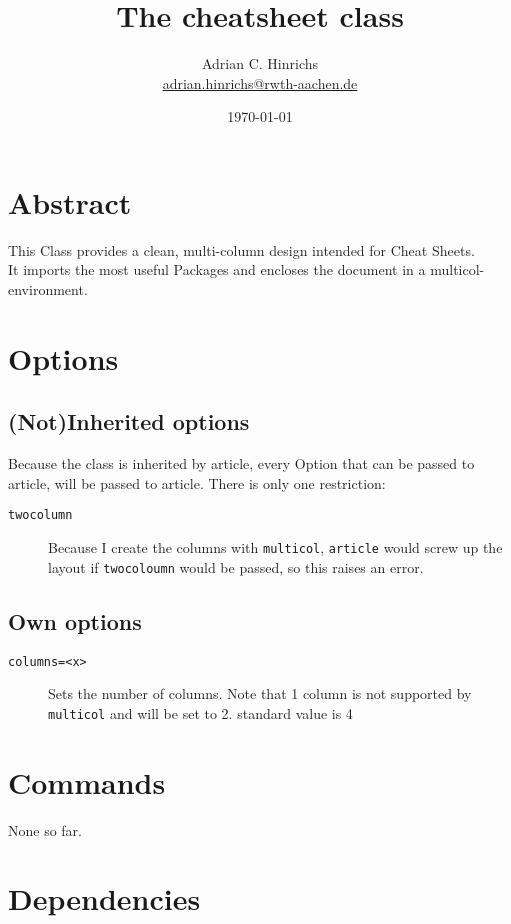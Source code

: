 \documentclass[a4paper,landscape,columns=3]{cheatsheet}
\title{The \textsf{cheatsheet} class\footnotemark}
\author{Adrian
  C. Hinrichs\\
  \href{mailto:adrian.hinrichs@rwth-aachen.de}{adrian.hinrichs@rwth-aachen.de}
}
\date{\today}
\begin{document}
\maketitle
{}
\section{Abstract}
This Class provides a clean, multi-column design intended for Cheat
Sheets.\\

It imports the most useful Packages and encloses the document in a
multicol-environment.
\section{Options}
\subsection{(Not)Inherited options}
Because the class is inherited by article, every Option that can be
passed to article, will be passed to article. There is only one
restriction:
\begin{description}
\item[\texttt{twocolumn}] Because I create the columns with
  \texttt{multicol}, \texttt{article} would screw up the layout if
  \texttt{twocoloumn} would be passed, so this raises an error.
\end{description}
\subsection{Own options}
\begin{description}
\item[\texttt{columns=<x>}] Sets the number of columns.  Note that 1
  column is not supported by \lstinline{multicol} and will be set to
  2.  standard value is 4
\end{description}
\section{Commands}
None so far.
\vfill\null\columnbreak
\section{Dependencies}
  
\end{document}
